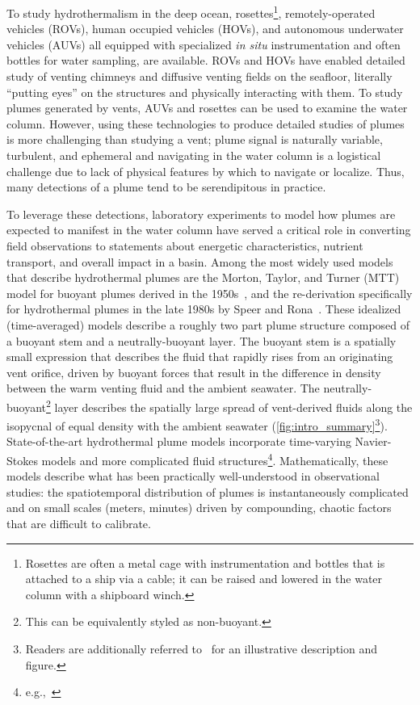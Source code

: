 To study hydrothermalism in the deep ocean, rosettes\footnote{Rosettes are often a metal cage with instrumentation and bottles that is attached to a ship via a cable; it can be raised and lowered in the water column with a shipboard winch.}, remotely-operated vehicles (ROVs), human occupied vehicles (HOVs), and autonomous underwater vehicles (AUVs) all equipped with specialized \emph{in situ} instrumentation and often bottles for water sampling, are available.
ROVs and HOVs have enabled detailed study of venting chimneys and diffusive venting fields on the seafloor, literally ``putting eyes'' on the structures and physically interacting with them.
To study plumes generated by vents, AUVs and rosettes can be used to examine the water column.
However, using these technologies to produce detailed studies of plumes is more challenging than studying a vent; plume signal is naturally variable, turbulent, and ephemeral and navigating in the water column is a logistical challenge due to lack of physical features by which to navigate or localize. 
Thus, many detections of a plume tend to be serendipitous in practice.

To leverage these detections, laboratory experiments to model how plumes are expected to manifest in the water column have served a critical role in converting field observations to statements about energetic characteristics, nutrient transport, and overall impact in a basin.
Among the most widely used models that describe hydrothermal plumes are the Morton, Taylor, and Turner (MTT) model for buoyant plumes derived in the 1950s~\autocite{morton1956turbulent}, and the re-derivation specifically for hydrothermal plumes in the late 1980s by Speer and Rona~\autocite{speer1989model}.
These idealized (time-averaged) models describe a roughly two part plume structure composed of a buoyant stem and a neutrally-buoyant layer. 
The buoyant stem is a spatially small expression that describes the fluid that rapidly rises from an originating vent orifice, driven by buoyant forces that result in the difference in density between the warm venting fluid and the ambient seawater.
The neutrally-buoyant\footnote{This can be equivalently styled as non-buoyant.} layer describes the spatially large spread of vent-derived fluids along the isopycnal of equal density with the ambient seawater (\cref{fig:intro_summary}\footnote{Readers are additionally referred to~\autocite{yoerger2007autonomous} for an illustrative description and figure.}). 
State-of-the-art hydrothermal plume models incorporate time-varying Navier-Stokes models and more complicated fluid structures\footnote{e.g.,~\autocite{lavelle2013turbulent,xu2012deep}}.
Mathematically, these models describe what has been practically well-understood in observational studies: the spatiotemporal distribution of plumes is instantaneously complicated and on small scales (meters, minutes) driven by compounding, chaotic factors that are difficult to calibrate.



